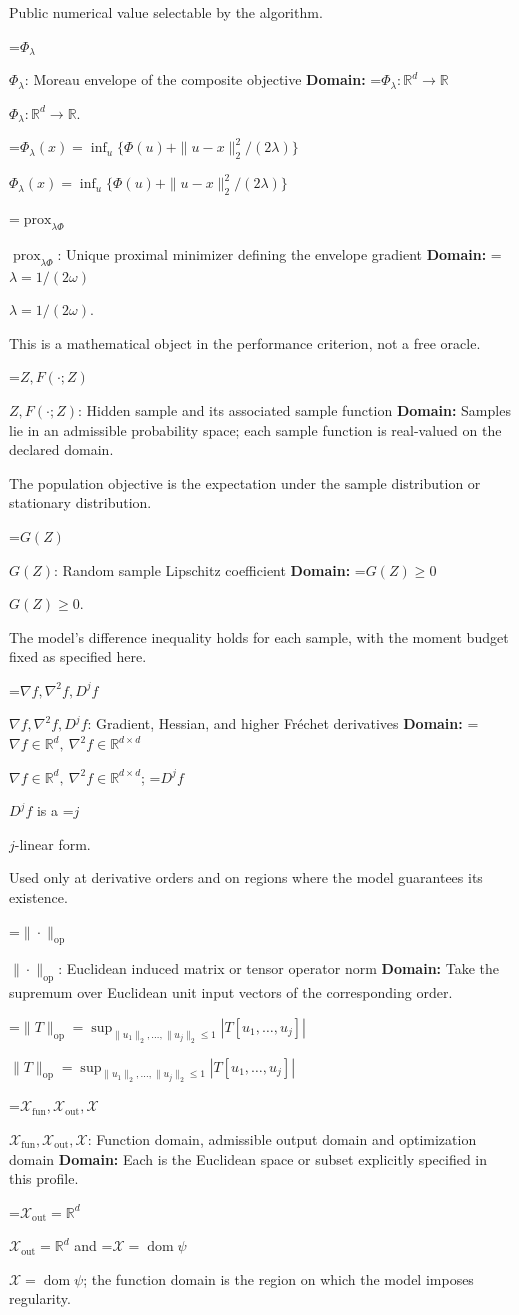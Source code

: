 \documentclass[10pt,a4paper]{article}
\newcommand{\AtlasMath}[1]{\par\begingroup\centering\setbox0=\hbox{$\displaystyle #1$}\ifdim\wd0>1.4\linewidth\typeout{ATLAS WIDE FORMULA: \the\wd0}\fi\ifdim\wd0>\linewidth\resizebox{\linewidth}{!}{\box0}\else\box0\fi\par\endgroup}
\newcommand{\AtlasInlineMath}[1]{\begingroup\setbox0=\hbox{$#1$}\ifdim\wd0>.4\linewidth\endgroup\AtlasMath{#1}\else\endgroup$#1$\fi}
\begin{document}
Public numerical value selectable by the algorithm.

\AtlasInlineMath{\Phi_\lambda}: Moreau envelope of the composite objective \textbf{Domain:} \AtlasInlineMath{\Phi_\lambda:\mathbb{R}^d\to\mathbb{R}}.

\AtlasInlineMath{\Phi_\lambda(x)=\inf_u\{\Phi(u)+\|u-x\|_2^2/(2\lambda)\}}

\AtlasInlineMath{\operatorname{prox}_{\lambda\Phi}}: Unique proximal minimizer defining the envelope gradient \textbf{Domain:} \AtlasInlineMath{\lambda=1/(2\omega)}.

This is a mathematical object in the performance criterion, not a free oracle.

\AtlasInlineMath{Z,F(\cdot;Z)}: Hidden sample and its associated sample function \textbf{Domain:} Samples lie in an admissible probability space; each sample function is real-valued on the declared domain.

The population objective is the expectation under the sample distribution or stationary distribution.

\AtlasInlineMath{G(Z)}: Random sample Lipschitz coefficient \textbf{Domain:} \AtlasInlineMath{G(Z)\ge0}.

The model's difference inequality holds for each sample, with the moment budget fixed as specified here.

\AtlasInlineMath{\nabla f,\nabla^2f,D^jf}: Gradient, Hessian, and higher Fréchet derivatives \textbf{Domain:} \AtlasInlineMath{\nabla f\in\mathbb{R}^d,\ \nabla^2f\in\mathbb{R}^{d\times d}}; \AtlasInlineMath{D^jf} is a \AtlasInlineMath{j}-linear form.

Used only at derivative orders and on regions where the model guarantees its existence.

\AtlasInlineMath{\|\cdot\|_{\mathrm{op}}}: Euclidean induced matrix or tensor operator norm \textbf{Domain:} Take the supremum over Euclidean unit input vectors of the corresponding order.

\AtlasInlineMath{\|T\|_{\mathrm{op}}=\sup_{\|u_1\|_2,\ldots,\|u_j\|_2\le1}|T[u_1,\ldots,u_j]|}

\AtlasInlineMath{\mathcal{X}_{\mathrm{fun}},\mathcal{X}_{\mathrm{out}},\mathcal{X}}: Function domain, admissible output domain and optimization domain \textbf{Domain:} Each is the Euclidean space or subset explicitly specified in this profile.

\AtlasInlineMath{\mathcal{X}_{\mathrm{out}}=\mathbb{R}^d} and \AtlasInlineMath{\mathcal{X}=\operatorname{dom}\psi}; the function domain is the region on which the model imposes regularity.
\end{document}
